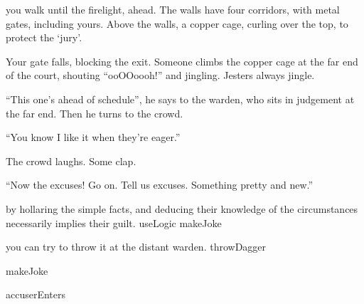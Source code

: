 you walk until the firelight, ahead.
The walls have four corridors, with metal gates, including yours.
Above the walls, a copper cage, curling over the top, to protect the `jury'.

Your gate falls, blocking the exit.
Someone climbs the copper cage at the far end of the \gls{court}, shouting ``ooOOoooh!'' and jingling.
Jesters always jingle.

``This one's ahead of schedule'', he says to the \gls{warden}, who sits in judgement at the far end.
Then he turns to the crowd.

``You know I like it when they're eager.''

The crowd laughs.
Some clap.

``Now the excuses!
Go on.
Tell us excuses.
Something pretty and new.''

\begin{selectPath}
  {by hollaring the simple facts, and deducing their knowledge of the circumstances necessarily implies their guilt.}%
  {useLogic}
  {}%
  {makeJoke}

  {you can try to throw it at the distant \gls{warden}.}%
  {throwDagger}

  {}%
  {makeJoke}

  {}%
  {accuserEnters}
\end{selectPath}

